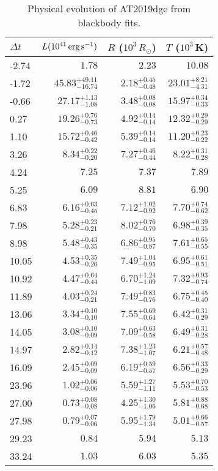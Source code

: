 \begin{table}[!htbp] 
	\centering 
	\caption{Physical evolution of AT2019dge from blackbody fits.} 
	\begin{tabular}{lrrr} 
		\hline 
		$\Delta t$ & $L (10^{41} \,{\rm erg\,s^{-1}})$ & $R$ ($10^{3}\,R_\odot$) & $T$ ($10^3$\,K) \\ 
		\hline
		-2.74 & $1.78$ & $2.23$ & $10.08$  \\
		-1.72 & $45.83^{+49.11}_{-16.74}$ &$2.18^{+0.45}_{-0.48}$ &$23.01^{+8.21}_{-4.31}$  \\
		-0.66 & $27.17^{+1.13}_{-1.08}$ &$3.48^{+0.08}_{-0.08}$ &$15.97^{+0.34}_{-0.33}$  \\
		0.27 & $19.26^{+0.76}_{-0.73}$ &$4.92^{+0.14}_{-0.14}$ &$12.32^{+0.29}_{-0.29}$  \\
		1.10 & $15.72^{+0.46}_{-0.42}$ &$5.39^{+0.14}_{-0.14}$ &$11.20^{+0.23}_{-0.22}$  \\
		3.26 & $8.34^{+0.22}_{-0.20}$ &$7.27^{+0.46}_{-0.44}$ &$8.22^{+0.31}_{-0.28}$  \\
		4.24 & $7.25$ & $7.37$ & $7.89$  \\
		5.25 & $6.09$ & $8.81$ & $6.90$  \\
		6.83 & $6.16^{+0.63}_{-0.45}$ &$7.12^{+1.02}_{-0.92}$ &$7.70^{+0.74}_{-0.62}$  \\
		7.98 & $5.28^{+0.23}_{-0.21}$ &$8.02^{+0.76}_{-0.70}$ &$6.98^{+0.39}_{-0.35}$  \\
		8.98 & $5.48^{+0.43}_{-0.35}$ &$6.86^{+0.95}_{-0.87}$ &$7.61^{+0.65}_{-0.55}$  \\
		10.05 & $4.53^{+0.35}_{-0.26}$ &$7.49^{+1.04}_{-0.95}$ &$6.95^{+0.61}_{-0.51}$  \\
		10.92 & $4.47^{+0.64}_{-0.44}$ &$6.70^{+1.24}_{-1.09}$ &$7.32^{+0.93}_{-0.74}$  \\
		11.89 & $4.03^{+0.24}_{-0.21}$ &$7.49^{+0.83}_{-0.76}$ &$6.75^{+0.45}_{-0.40}$  \\
		13.06 & $3.34^{+0.10}_{-0.10}$ &$7.55^{+0.69}_{-0.64}$ &$6.42^{+0.31}_{-0.29}$  \\
		14.05 & $3.08^{+0.10}_{-0.09}$ &$7.09^{+0.63}_{-0.58}$ &$6.49^{+0.31}_{-0.28}$  \\
		14.97 & $2.82^{+0.14}_{-0.12}$ &$7.38^{+1.23}_{-1.07}$ &$6.21^{+0.57}_{-0.48}$  \\
		16.09 & $2.45^{+0.09}_{-0.09}$ &$6.19^{+0.59}_{-0.57}$ &$6.56^{+0.33}_{-0.29}$  \\
		23.96 & $1.02^{+0.06}_{-0.06}$ &$5.59^{+1.27}_{-1.11}$ &$5.53^{+0.70}_{-0.53}$  \\
		27.00 & $0.73^{+0.08}_{-0.08}$ &$4.25^{+1.30}_{-1.06}$ &$5.81^{+0.88}_{-0.68}$  \\
		27.98 & $0.79^{+0.07}_{-0.06}$ &$5.95^{+1.79}_{-1.34}$ &$5.01^{+0.66}_{-0.57}$  \\
		29.23 & $0.84$ & $5.94$ & $5.13$  \\
		33.24 & $1.03$ & $6.03$ & $5.35$  \\
		\hline 
	\end{tabular} 
	\label{tab:bbfit} 
\end{table} 
